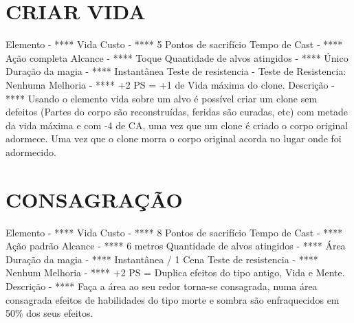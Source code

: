 \documentclass{article}%
\begin{document}
%
\section{CRIAR VIDA}%
\label{sec:CRIARVIDA}%
Elemento {-} **** Vida\newline%
Custo {-} **** 5 Pontos de sacrifício\newline%
Tempo de Cast {-} **** Ação completa\newline%
Alcance {-} **** Toque\newline%
Quantidade de alvos atingidos {-} **** Único\newline%
Duração da magia {-} **** Instantânea\newline%
Teste de resistencia {-} Teste de Resistencia: Nenhuma\newline%
Melhoria {-} **** +2 PS = +1 de Vida máxima do clone.\newline%
Descrição {-} **** Usando o elemento vida sobre um alvo é possível criar um clone sem defeitos (Partes do corpo são reconstruídas, feridas são curadas, etc) com metade da vida máxima e com {-}4 de CA, uma vez que um clone é criado o corpo original adormece. Uma vez que o clone morra o corpo original acorda no lugar onde foi adormecido.\newline%

%
\section{CONSAGRAÇÃO}%
\label{sec:CONSAGRAO}%
Elemento {-} **** Vida\newline%
Custo {-} **** 8 Pontos de sacrifício\newline%
Tempo de Cast {-} **** Ação padrão\newline%
Alcance {-} **** 6 metros\newline%
Quantidade de alvos atingidos {-} **** Área\newline%
Duração da magia {-} **** Instantânea / 1 Cena\newline%
Teste de resistencia {-} **** Nenhum\newline%
Melhoria {-} **** +2 PS = Duplica efeitos do tipo antigo, Vida e Mente.\newline%
Descrição {-} **** Faça a área ao seu redor torna{-}se consagrada, numa área consagrada efeitos de habilidades do tipo morte e sombra são enfraquecidos em 50\% dos seus efeitos.\newline%

%
\end{document}
